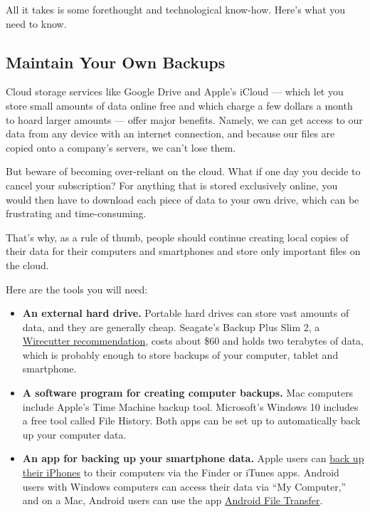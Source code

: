 All it takes is some forethought and technological know-how. Here's what
you need to know.

\hypertarget{maintain-your-own-backups}{%
\subsection{Maintain Your Own Backups}\label{maintain-your-own-backups}}

Cloud storage services like Google Drive and Apple's iCloud --- which
let you store small amounts of data online free and which charge a few
dollars a month to hoard larger amounts --- offer major benefits.
Namely, we can get access to our data from any device with an internet
connection, and because our files are copied onto a company's servers,
we can't lose them.

But beware of becoming over-reliant on the cloud. What if one day you
decide to cancel your subscription? For anything that is stored
exclusively online, you would then have to download each piece of data
to your own drive, which can be frustrating and time-consuming.

That's why, as a rule of thumb, people should continue creating local
copies of their data for their computers and smartphones and store only
important files on the cloud.

Here are the tools you will need:

\begin{itemize}
\item
  \textbf{An external hard drive.} Portable hard drives can store vast
  amounts of data, and they are generally cheap. Seagate's Backup Plus
  Slim 2, a
  \href{https://thewirecutter.com/reviews/best-portable-hard-drive/}{Wirecutter
  recommendation}, costs about \$60 and holds two terabytes of data,
  which is probably enough to store backups of your computer, tablet and
  smartphone.
\item
  \textbf{A software program for creating computer backups.} Mac
  computers include Apple's Time Machine backup tool. Microsoft's
  Windows 10 includes a free tool called File History. Both apps can be
  set up to automatically back up your computer data.
\item
  \textbf{An app for backing up your smartphone data.} Apple users can
  \href{https://support.apple.com/en-us/HT203977\#computer}{back up
  their iPhones} to their computers via the Finder or iTunes apps.
  Android users with Windows computers can access their data via ``My
  Computer,'' and on a Mac, Android users can use the app
  \href{https://www.android.com/filetransfer/}{Android File Transfer}.
\end{itemize}

